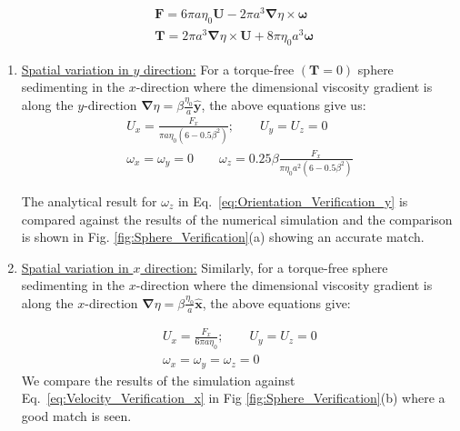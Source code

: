 \documentclass{jfm}
\begin{document}
\begin{equation*}
\begin{aligned}
&\boldsymbol{F}= 6 \pi a \eta_{0} \boldsymbol{U} - 2 \pi a^{3} \boldsymbol{\nabla} \eta \times \boldsymbol{\omega} \\
&\boldsymbol{T}= 2 \pi a^{3} \boldsymbol{\nabla} \eta \times \boldsymbol{U} + 8 \pi \eta_{0} a^{3} \boldsymbol{\omega}
\end{aligned}
\end{equation*}

\begin{enumerate}
    \item \underline{Spatial variation in $y$ direction:}  For a torque-free $(\boldsymbol{T} = 0)$ sphere sedimenting in the $x$-direction where the dimensional viscosity gradient is along the $y$-direction $\boldsymbol{\nabla}\eta = \beta \frac{\eta_0}{a} \boldsymbol{\hat{y}}$, the above equations give us:
\begin{align}
\label{eq:Velocity_Verification_y}
      U_x = \frac{F_x}{\pi a \eta_0 (6-0.5\beta^2)}; \qquad  U_y = U_z = 0  \\
\label{eq:Orientation_Verification_y}
    \omega_x = \omega_y = 0 \qquad \omega_z = 0.25\beta \frac{F_x}{\pi \eta_0 a^2 (6-0.5\beta^2)}
\end{align}
 
The analytical result for $\omega_z$ in Eq.~\eqref{eq:Orientation_Verification_y} is compared against the results of the numerical simulation and the comparison is shown in Fig. \ref{fig:Sphere_Verification}(a) showing an accurate match.

\item \underline{Spatial variation in $x$ direction:} Similarly, for a torque-free sphere sedimenting in the $x$-direction where the dimensional viscosity gradient is along the $x$-direction $\boldsymbol{\nabla} \eta = \beta \frac{\eta_0}{a} \boldsymbol{\hat{x}}$, the above equations give:

\begin{align}
    \label{eq:Velocity_Verification_x}
      U_x = \frac{F_x}{6\pi a \eta_0}; \qquad  U_y = U_z = 0  \\
\label{eq:Orientation_Verification_x}
    \omega_x = \omega_y =  \omega_z = 0
\end{align}
We compare the results of the simulation against Eq.~\eqref{eq:Velocity_Verification_x} in Fig \ref{fig:Sphere_Verification}(b) where a good match is seen.
\end{enumerate}
\end{document}
